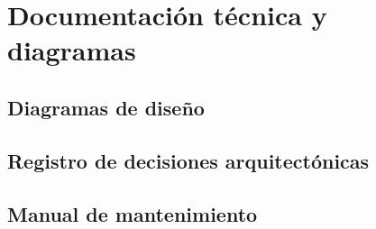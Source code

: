 
\chapter{Documentación técnica y diagramas}
\label{cha:doc-tecnica}

\section{Diagramas de diseño}
\label{sec:tec-diagramas}


\section{Registro de decisiones arquitectónicas}
\label{sec:tec-adr}


\section{Manual de mantenimiento}
\label{sec:tec-mantenimiento}



